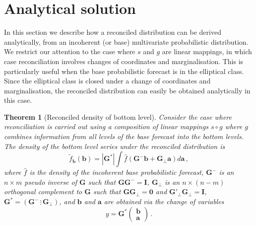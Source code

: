 \documentclass[12pt]{article}
\newtheorem{theo}{Theorem}[section]
\theoremstyle{definition}
\begin{document}
\section{Analytical solution} \label{sec:ParamRecon}

In this section we describe how a reconciled distribution can be derived analytically, from an incoherent (or base) multivariate probabilistic distribution.  We restrict our attention to the case where $s$ and $g$ are linear mappings, in which case reconciliation involves changes of coordinates and marginalisation.  This is particularly useful when the base probabilistic forecast is in the elliptical class. Since the elliptical class is closed under a change of coordinates and marginalisation, the reconciled distribution can easily be obtained analytically in this case. 

%

\begin{theo}[Reconciled density of bottom level]\label{theo:bottomdens}
	Consider the case where reconciliation is carried out using a composition of linear mappings $s\circ g$ where $g$ combines information from all levels of the base forecast into the bottom levels.  The density of the bottom level series under the reconciled distribution is
	\[
	\tilde{f}_{\bm{b}}(\bm{b})=|\bm{G^*}|\int \hat{f}(\bm{G}^{-}{\bm b}+\bm{G}_\perp {\bm a})d\bm{a}\,,
	\]
	where $\hat{f}$ is the density of the incoherent base probabilistic forecast, $\bm{G^-}$ is an $n\times m$ pseudo inverse of $\bm{G}$ such that $\bm{G}\bm{G}^-=\bm{I}$, $\bm{G_\perp}$ is an $n\times (n-m)$ orthogonal complement to $\bm{G}$ such that $\bm{G}\bm{G}_\perp=\bm{0}$ and $\bm{G}'_\perp\bm{G}_\perp=\bm{I}$, $\bm{G^*}=\left(\bm{G}^-\,\vdots\,\bm{G}_\perp\right)$, and $\bm{b}$ and $\bm{a}$ are obtained via the change of variables
	\[
	y=\bm{G^*}\begin{pmatrix}\bm{b}\\\bm{a}\end{pmatrix}\,.
	\] 
\end{theo}
\end{document}
